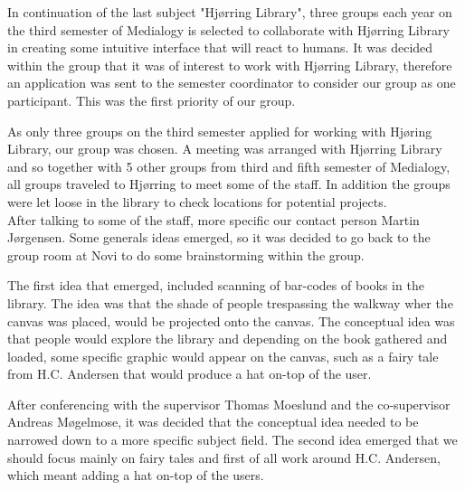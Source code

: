 In continuation of the last subject "Hjørring Library", three groups each year on the third semester of Medialogy is selected to collaborate with Hjørring Library in creating some intuitive interface that will react to humans. It was decided within the group that it was of interest to work with Hjørring Library, therefore an application was sent to the semester coordinator to consider our group as one participant. This was the first priority of our group.

As only three groups on the third semester applied for working with Hjøring Library, our group was chosen. A meeting was arranged with Hjørring Library and so together with 5 other groups from third and fifth semester of Medialogy, all groups traveled to Hjørring to meet some of the staff. In addition the groups were let loose in the library to check locations for potential projects.\\
After talking to some of the staff, more specific our contact person Martin Jørgensen. Some generals ideas emerged, so it was decided to go back to the group room at Novi to do some brainstorming within the group.

The first idea that emerged, included scanning of bar-codes of books in the library. The idea was that the shade of people trespassing the walkway wher the canvas was placed, would be projected onto the canvas. The conceptual idea was that people would explore the library and depending on the book gathered and loaded, some specific graphic would appear on the canvas, such as a fairy tale from H.C. Andersen that would produce a hat on-top of the user.

After conferencing with the supervisor Thomas Moeslund and the co-supervisor Andreas Møgelmose, it was decided that the conceptual idea needed to be narrowed down to a more specific subject field. The second idea emerged that we should focus mainly on fairy tales and first of all work around H.C. Andersen, which meant adding a hat on-top of the users.

